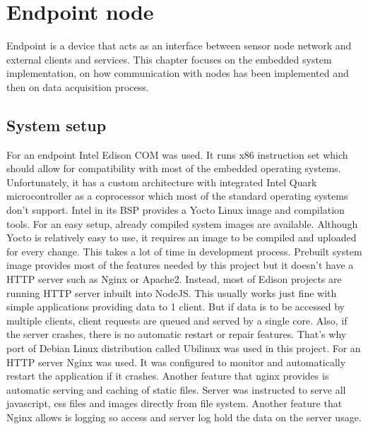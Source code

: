 \chapter{Endpoint node}
\label{chap:endpoint}

Endpoint is a device that acts as an interface between sensor node network and external clients and services. This chapter focuses on the embedded system implementation, on how communication with nodes has been implemented and then on data acquisition process.


\section{System setup}

For an endpoint Intel Edison \ac{COM} was used. It runs x86 instruction set\cite{Edison} which should allow for compatibility with most of the embedded operating systems. Unfortunately, it has a custom architecture with integrated Intel Quark microcontroller as a coprocessor which most of the standard operating systems don't support. Intel in its \ac{BSP} provides a Yocto Linux image and compilation tools\cite{yocto}. For an easy setup, already compiled system images are available. Although Yocto is relatively easy to use, it requires an image to be compiled and uploaded for every change. This takes a lot of time in development process. Prebuilt system image provides most of the features needed by this project but it doesn't have a \ac{HTTP} server such as Nginx or Apache2. Instead, most of Edison projects are running \ac{HTTP} server inbuilt into NodeJS. This usually works just fine with simple applications providing data to 1 client. But if data is to be accessed by multiple clients, client requests are queued and served by a single core. Also, if the server crashes, there is no automatic restart or repair features. That's why port of Debian Linux distribution called Ubilinux was used in this project\cite{ubilinux}. For an \ac{HTTP} server Nginx was used\cite{nginx}. It was configured to monitor and automatically restart the application if it crashes. Another feature that nginx provides is automatic serving and caching of static files. Server was instructed to serve all javascript, css files and images directly from file system. Another feature that Nginx allows is logging so access and server log hold the data on the server usage.

